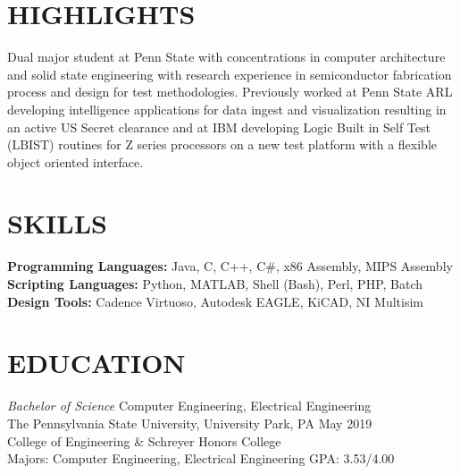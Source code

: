 \documentclass[line,margin]{res}
\begin{document}
	\address{235 S. Buckhout St. State College, PA 16801}
	\address{(484) 904-2099}
	
	\begin{resume}
		\section{HIGHLIGHTS} Dual major student at Penn State with concentrations in computer architecture and solid state engineering with research experience in semiconductor fabrication process and design for test methodologies.  Previously worked at Penn State ARL developing intelligence applications for data ingest and visualization resulting in an active US Secret clearance and at IBM developing Logic Built in Self Test (LBIST) routines for Z series processors on a new test platform with a flexible object oriented interface.
		
		\section{SKILLS}
		\textbf{Programming Languages:} Java, C, C++, C\#, x86 Assembly, MIPS Assembly\\
		\textbf{Scripting Languages:} Python, MATLAB, Shell (Bash), Perl, PHP, Batch\\
		\textbf{Design Tools:} Cadence Virtuoso, Autodesk EAGLE, KiCAD, NI Multisim
		
		\section{EDUCATION}{\sl Bachelor of Science} Computer Engineering, Electrical Engineering \\
		The Pennsylvania State University, University Park, PA \hfill May 2019\\
		College of Engineering \& Schreyer Honors College\\
		Majors: Computer Engineering, Electrical Engineering \hfill GPA: 3.53/4.00
		

\end{resume}
\end{document}
